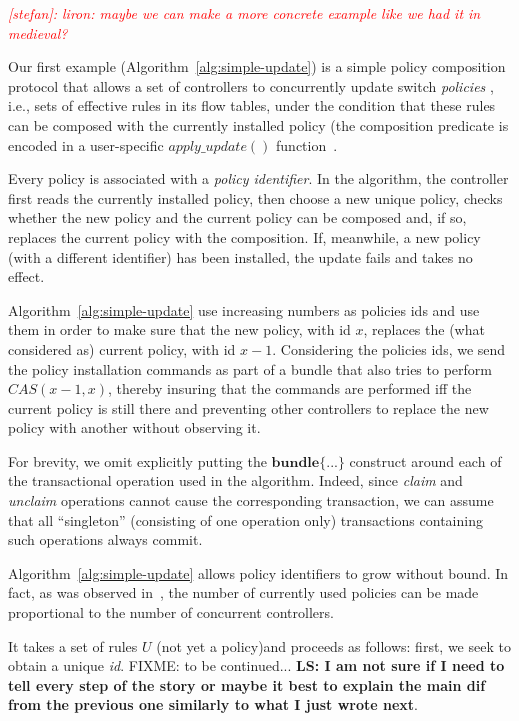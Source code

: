 \documentclass[conference]{sigcomm-alternate}
\newcommand{\stefan}[1]{\textit{\textcolor{red}{[stefan]: #1}}} %
\begin{document}
\stefan{liron: maybe we can make a more concrete example like we had it in medieval?}

Our first example (Algorithm~\ref{alg:simple-update}) is a simple policy composition protocol that
allows a set of  controllers to concurrently update switch  \emph{policies} , i.e., sets of
effective rules in its flow tables, under the
condition that these rules can be composed with the currently installed
policy (the composition predicate is encoded in a user-specific
$\textit{apply\_update}()$ function~\cite{cpc}.

Every policy is associated with a \emph{policy identifier}.
In the algorithm, the controller first reads the currently installed
policy, then choose a new unique policy, checks whether the new
policy and the current policy can be composed and, if so, replaces the
current policy with the composition. If, meanwhile, a new
policy (with a different identifier) has been installed, the update
fails and takes no effect.

Algorithm~\ref{alg:simple-update} use increasing numbers as policies
ids and use them in order to make sure that the new policy, with id
$x$, replaces the (what considered as) current policy, with id
$x-1$. Considering the policies ids, we send the policy installation
commands as part of a bundle that also tries to perform
$CAS(x-1,x)$, thereby insuring that the commands are
performed iff the current policy is still there and preventing other
controllers to replace the new policy with another without observing it.

For brevity, we omit explicitly putting the $\textbf{bundle}\{...\}$ construct
around each of the transactional operation used in the algorithm.
Indeed, since \textit{claim} and \textit{unclaim} operations cannot
cause the corresponding transaction, we can assume that all
``singleton'' (consisting of one operation only)  transactions
containing such operations always commit.

Algorithm~\ref{alg:simple-update} allows policy identifiers to grow
without bound. In fact, as was observed in~\cite{cpc}, the number of currently
used policies can be made proportional to the number of concurrent
controllers.


 It takes a set of rules $U$ (not yet a policy)and proceeds as follows: first, we seek to
 obtain a unique \emph{id}. FIXME: to be continued...
 \textbf{LS: I am not sure if I need to tell every step of the story or maybe it best to explain the main dif from the previous one similarly to what I just wrote next}.
\end{document}

